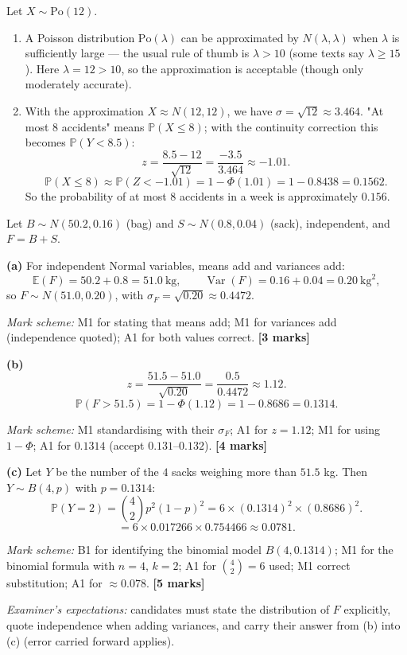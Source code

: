\documentclass[11pt]{article}
\begin{document}
\begin{corrige}
Let $X \sim \mathrm{Po}(12)$.
\begin{enumerate}
\item A Poisson distribution $\mathrm{Po}(\lambda)$ can be approximated by $N(\lambda, \lambda)$ when $\lambda$ is sufficiently large — the usual rule of thumb is $\lambda > 10$ (some texts say $\lambda \ge 15$). Here $\lambda = 12 > 10$, so the approximation is acceptable (though only moderately accurate).
\item With the approximation $X \approx N(12, 12)$, we have $\sigma = \sqrt{12} \approx 3.464$. "At most $8$ accidents" means $\mathbb{P}(X \le 8)$; with the continuity correction this becomes $\mathbb{P}(Y < 8.5)$:
\[
z = \frac{8.5 - 12}{\sqrt{12}} = \frac{-3.5}{3.464} \approx -1.01.
\]
\[
\mathbb{P}(X \le 8) \approx \mathbb{P}(Z < -1.01) = 1 - \Phi(1.01) = 1 - 0.8438 = 0.1562.
\]
So the probability of at most $8$ accidents in a week is approximately $0.156$.
\end{enumerate}
\end{corrige}

\begin{corrige}
Let $B \sim N(50.2, 0.16)$ (bag) and $S \sim N(0.8, 0.04)$ (sack), independent, and $F = B + S$.

\textbf{(a)} For independent Normal variables, means add and variances add:
\[
\mathbb{E}(F) = 50.2 + 0.8 = 51.0\ \mathrm{kg}, \qquad \operatorname{Var}(F) = 0.16 + 0.04 = 0.20\ \mathrm{kg}^2,
\]
so $F \sim N(51.0, 0.20)$, with $\sigma_F = \sqrt{0.20} \approx 0.4472$.

\emph{Mark scheme:} M1 for stating that means add; M1 for variances add (independence quoted); A1 for both values correct. \textbf{[3 marks]}

\textbf{(b)}
\[
z = \frac{51.5 - 51.0}{\sqrt{0.20}} = \frac{0.5}{0.4472} \approx 1.12.
\]
\[
\mathbb{P}(F > 51.5) = 1 - \Phi(1.12) = 1 - 0.8686 = 0.1314.
\]

\emph{Mark scheme:} M1 standardising with their $\sigma_F$; A1 for $z = 1.12$; M1 for using $1 - \Phi$; A1 for $0.1314$ (accept $0.131$–$0.132$). \textbf{[4 marks]}

\textbf{(c)} Let $Y$ be the number of the $4$ sacks weighing more than $51.5$ kg. Then $Y \sim B(4, p)$ with $p = 0.1314$:
\[
\mathbb{P}(Y = 2) = \binom{4}{2} p^2 (1-p)^2 = 6 \times (0.1314)^2 \times (0.8686)^2.
\]
\[
= 6 \times 0.017266 \times 0.754466 \approx 0.0781.
\]

\emph{Mark scheme:} B1 for identifying the binomial model $B(4, 0.1314)$; M1 for the binomial formula with $n=4$, $k=2$; A1 for $\binom{4}{2} = 6$ used; M1 correct substitution; A1 for $\approx 0.078$. \textbf{[5 marks]}

\emph{Examiner's expectations:} candidates must state the distribution of $F$ explicitly, quote independence when adding variances, and carry their answer from (b) into (c) (error carried forward applies).
\end{corrige}
\end{document}
